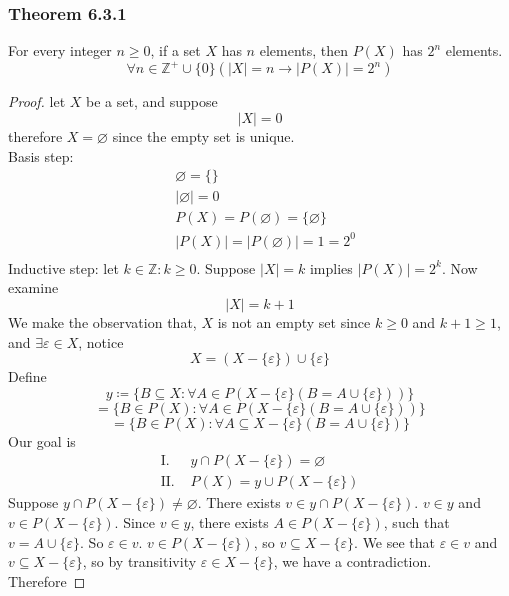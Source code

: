\documentclass[12pt]{book}
\newcommand{\Z}{\mathbb{Z}}
\newcommand{\paren}[1]{\left( #1 \right)}
\newcommand{\abso}[1]{\left|#1 \right|}
\newcommand{\then}{\rightarrow}
\newcommand{\nonneg}{\Z^+ \cup \{0\}}
\begin{document}
    \subsubsection{Theorem 6.3.1}
    For every integer $n\geq 0$, if a set $X$ has $n$ elements, then $P(X)$ has $2^n$ elements.
    \[
    \forall n \in \nonneg \paren{\abso{X} = n \then \abso{P(X)}= 2^n}
    \]
    \begin{proof}
        let $X$ be a set, and suppose 
        \[
        \abso{X} = 0
        \]
        therefore $X = \varnothing$ since the empty set is unique.\\
        Basis step: 
        \begin{align*}
        &\varnothing = \{\}\\    
        &\abso{\varnothing} = 0\\
        &P(X)=P(\varnothing) = \{\varnothing\}\\
        &\abso{P(X)} = \abso{P(\varnothing)} = 1 = 2^0\\
        \end{align*}
        Inductive step: let $k \in \Z : k \geq 0$. Suppose $\abso{X} = k$ implies $\abso{P(X)}=2^k$. Now examine 
        \[
        \abso{X} = k + 1
        \]
        We make the observation that, $X$ is not an empty set since $ k\geq 0$ and $k + 1 \geq 1$, and $\exists \varepsilon \in X$, notice
        \[
        X = \paren{X - \{ \varepsilon \} } \cup \{ \varepsilon \}
        \]
        Define
        \[
        y \coloneqq \{ B \subseteq X : \forall A \in P\paren{X-\{\varepsilon\}\paren{B = A \cup \{\varepsilon\}}}\}
        \]
        \[
        = \{ B \in P(X):\forall A \in P\paren{X-\{\varepsilon\}\paren{B = A \cup \{\varepsilon\}}}\}
        \]
        \[
        = \{ B \in P(X): \forall A \subseteq X-\{\varepsilon\}\paren{B = A \cup \{\varepsilon\}}\}
        \]
        Our goal is 
        \begin{align*}
            \text{I. } &y \cap P(X - \{\varepsilon\}) = \varnothing\\
            \text{II. }&P(X) = y \cup P\paren{X - \{\varepsilon\}}
        \end{align*}
        Suppose $y \cap P(X - \{\varepsilon\}) \neq \varnothing$. There exists $v \in y \cap P(X - \{\varepsilon\})$. $v \in y$ and $ v \in P(X - \{\varepsilon\})$. Since $v \in y$, there exists $A \in P(X - \{\varepsilon\})$, such that $v = A \cup \{ \varepsilon\}$. So $\varepsilon \in v$. $v \in P(X - \{\varepsilon\})$, so $v \subseteq X - \{ \varepsilon\}$. We see that $\varepsilon \in v$ and $v \subseteq X - \{ \varepsilon \}$, so by transitivity $\varepsilon \in X - \{ \varepsilon \} $, we have a contradiction. Therefore 

\end{proof}
\end{document}

